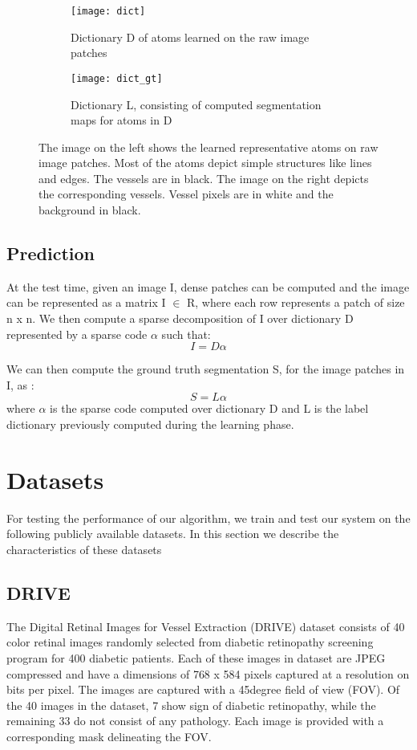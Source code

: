 \begin{figure}
	\begin{subfigure}[b]{0.45\textwidth}
		\texttt{[image: dict]}
		\caption{Dictionary D of atoms learned on the raw image patches}
		\label{fig:dict}
	\end{subfigure}
	\begin{subfigure}[b]{0.45\textwidth}
		\texttt{[image: dict\_gt]}
		\caption{Dictionary L, consisting of computed segmentation maps for atoms in D}
		\label{fig:dictgt}
	\end{subfigure}
	\caption[Dictionary of image atoms and segmentations]{The image on the left shows the learned representative atoms on raw image patches. Most of the atoms depict simple structures like lines and edges. The vessels are in black. The image on the right depicts the corresponding vessels. Vessel pixels are in white and the background in black.}
	\label{fig:dl-cls}
\end{figure}
\clearpage
\subsection{Prediction}
At the test time, given an image I, dense patches can be computed and the image can be represented as a matrix I $\in$ R, where each row represents a patch of size n x n. We then compute a sparse decomposition of I over dictionary D represented by a sparse code $\alpha$ such that:
$$
I = D \alpha
$$

We can then compute the ground truth segmentation S, for the image patches in I, as :
$$
S = L\alpha
$$
where $\alpha$ is the sparse code computed over dictionary D and L is the label dictionary previously computed during the learning phase.

\section{Datasets}
For testing the performance of our algorithm, we train and test our system on the following publicly available datasets. In this section we describe the characteristics of these datasets

\subsection{DRIVE}
The Digital Retinal Images for Vessel Extraction (DRIVE) dataset \cite{drivedataset} consists of 40 color retinal images randomly selected from diabetic retinopathy screening program for 400 diabetic patients. Each of these images in dataset are JPEG compressed and have a dimensions of 768 x 584 pixels captured at a resolution on bits per pixel. The images are captured with a 45degree field of view (FOV).
Of the 40 images in the dataset, 7 show sign of diabetic retinopathy, while the remaining 33 do not consist of any pathology. Each image is provided with a corresponding mask delineating the FOV.\\


